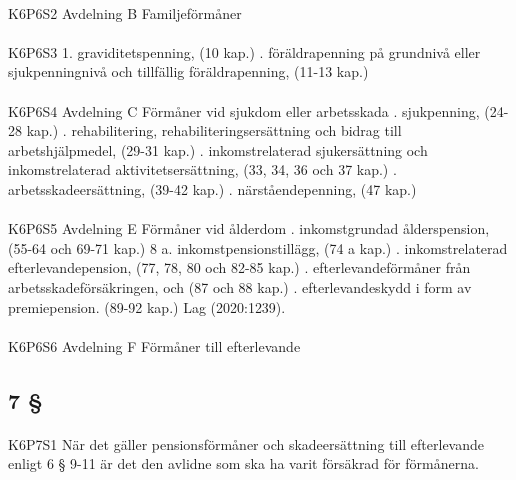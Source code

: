 \documentclass[a4paper,notitlepage,openany,10pt]{book}
\begin{document}
\paragraph*{}
{\tiny K6P6S2}
Avdelning B Familjeförmåner
\paragraph*{}
{\tiny K6P6S3}
1. graviditetspenning, (10 kap.)
. föräldrapenning på grundnivå eller sjukpenningnivå och
tillfällig föräldrapenning, (11-13 kap.)
\paragraph*{}
{\tiny K6P6S4}
Avdelning C Förmåner vid sjukdom eller arbetsskada
. sjukpenning, (24-28 kap.)
. rehabilitering, rehabiliteringsersättning och
bidrag till arbetshjälpmedel, (29-31 kap.)
. inkomstrelaterad sjukersättning och inkomstrelaterad
aktivitetsersättning, (33, 34, 36 och 37 kap.)
. arbetsskadeersättning, (39-42 kap.)
. närståendepenning, (47 kap.)
\paragraph*{}
{\tiny K6P6S5}
Avdelning E Förmåner vid ålderdom
. inkomstgrundad ålderspension, (55-64 och 69-71 kap.)
8 a. inkomstpensionstillägg, (74 a kap.)
. inkomstrelaterad
efterlevandepension, (77, 78, 80 och 82-85
kap.)
. efterlevandeförmåner från
arbetsskadeförsäkringen, och (87 och 88 kap.)
. efterlevandeskydd i form av
premiepension. (89-92 kap.)
Lag (2020:1239).
\paragraph*{}
{\tiny K6P6S6}
Avdelning F Förmåner till efterlevande
\subsection*{7 §}
\paragraph*{}
{\tiny K6P7S1}
När det gäller pensionsförmåner och skadeersättning till efterlevande enligt 6 § 9-11 är det den avlidne som ska ha varit försäkrad för förmånerna.
\end{document}
